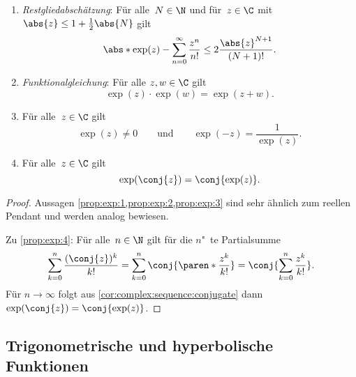 \documentclass[a4paper]{article}
\begin{document}
\begin{proposition}\leavevmode
    \begin{enumerate}
        \item \emph{Restgliedabschätzung}: Für alle~$N \in \N$ und für~$z \in \C$ mit~$\abs{z} \leq 1+\frac{1}{2}\abs{N}$ gilt
        \begin{equation*}
            \abs*{\exp(z) - \sum_{n=0}^\infty \frac{z^n}{n!}} \leq 2\frac{\abs{z}^{N+1}}{(N+1)!}.
        \end{equation*}\label{prop:exp:1}
        \item \emph{Funktionalgleichung}: Für alle $z, w \in \C$ gilt
        \begin{equation*}
            \exp(z) \cdot \exp(w) = \exp(z+w).
        \end{equation*}\label{prop:exp:2}
        \item Für alle~$z \in \C$ gilt
        \begin{equation*}
            \exp(z) \neq 0 \qquad\text{und}\qquad \exp(-z) = \frac{1}{\exp(z)}.
        \end{equation*}\label{prop:exp:3}
        \item Für alle~$z \in \C$ gilt
        \begin{equation*}
            \exp(\conj{z}) = \conj{\exp(z)}.
        \end{equation*}\label{prop:exp:4}
    \end{enumerate}
\end{proposition}

\begin{proof}
    Aussagen \cref{prop:exp:1,prop:exp:2,prop:exp:3} sind sehr ähnlich zum reellen Pendant und werden analog bewiesen.

    Zu \cref{prop:exp:4}: Für alle~$n \in \N$ gilt für die $n$"~te Partialsumme
    \begin{equation*}
        \sum_{k=0}^n \frac{(\conj{z})^k}{k!} = \sum_{k=0}^n \conj{\paren*{\frac{z^k}{k!}}} = \conj{\sum_{k=0}^n \frac{z^k}{k!}}.
    \end{equation*}
    Für $n \to \infty$ folgt aus \cref{cor:complex:sequence:conjugate} dann $\exp(\conj{z}) = \conj{\exp(z)}$.
\end{proof}

\subsection{Trigonometrische und hyperbolische Funktionen}
\end{document}
